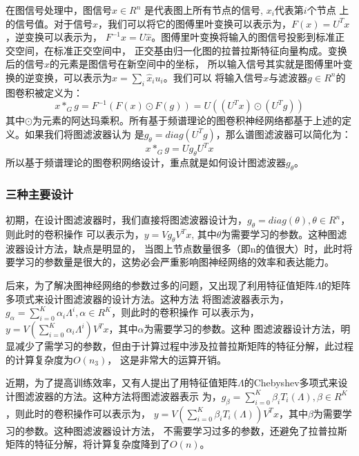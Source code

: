 在图信号处理中，图信号$ x\in R^n $ 是代表图上所有节点的信号, $ x_i $代表第$ i $个节点
上的信号值。对于信号$ x $，我们可以将它的图傅里叶变换可以表示为，$ F(x)=U^{T}x $，逆变换可以表示为，
$ F^{-1} \widehat{x} = U\widehat{x} $。图傅里叶变换将输入的图信号投影到标准正交空间，在标准正交空间中，
正交基由归一化图的拉普拉斯特征向量构成。变换后的信号$ \widehat{x} $的元素是图信号在新空间中的坐标，
所以输入信号其实就是图傅里叶变换的逆变换，可以表示为$ x = {\sum_{i}}\widehat{x}_{i}u_{i} $。我们可以
将输入信号$ x $与滤波器$ g \in R^{n} $的图卷积被定义为：
$$ x\ast_{G}g = F^{-1}(F(x) \odot F(g)) = U((U^{T}x) \odot (U^{T}g)) $$
其中$ \odot $为元素的阿达玛乘积。所有基于频谱理论的图卷积神经网络都基于上述的定义。如果我们将图滤波器认为
是$ g_{\theta}=diag(U^{T}g) $，那么谱图滤波器可以简化为：
$$ x\ast_{G}g = U g_{\theta} U^{T} x $$
所以基于频谱理论的图卷积网络设计，重点就是如何设计图滤波器$ g_{\theta} $。

\subsubsection{三种主要设计}
初期，在设计图滤波器时，我们直接将图滤波器设计为，$ g_{\theta} = diag(\theta),\theta \in R^n $，则此时的卷积操作
可以表示为，$ y = V g_{\theta} V^{T} x $, 其中$ \theta $为需要学习的参数。这种图滤波器设计方法，缺点是明显的，
当图上节点数量很多（即n的值很大）时，此时将要学习的参数量是很大的，这势必会严重影响图神经网络的效率和表达能力。

后来，为了解决图神经网络的参数过多的问题，又出现了利用特征值矩阵$ \Lambda $的矩阵多项式来设计图滤波器的设计方法。这种方法
将图滤波器表示为，$ g_{\alpha} = {\sum_{i=0}^{K}} \alpha_{i} \Lambda^{i},  \alpha \in R^K $，则此时的卷积操作
可以表示为，$ y = V ({\sum_{i=0}^{K}} \alpha_{i} \Lambda^{i}) V^{T} x $，其中$ \alpha $为需要学习的参数。这种
图滤波器设计方法，明显减少了需学习的参数，但由于计算过程中涉及拉普拉斯矩阵的特征分解，此过程的计算复杂度为$ O(n_{3}) $，
这是非常大的运算开销。

近期，为了提高训练效率，又有人提出了用特征值矩阵$ \Lambda $的Chebyshev多项式来设计图滤波器的方法。这种方法将图滤波器表示
为，$ g_{\beta} = {\sum_{i=0}^{K}} \beta_{i} T_{i}(\Lambda),  \beta \in R^K $，则此时的卷积操作可以表示为，
$ y = V ({\sum_{i=0}^{K}} \beta_{i} T_{i}(\Lambda)) V^{T} x $，其中$ \beta $为需要学习的参数。这种图滤波器设计方法，
不需要学习过多的参数，还避免了拉普拉斯矩阵的特征分解，将计算复杂度降到了$ O(n) $。

